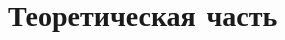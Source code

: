 \documentclass[a4paper,oneside,12pt]{extreport}
\begin{document}


\section*{Теоретическая часть}





\end{document}
